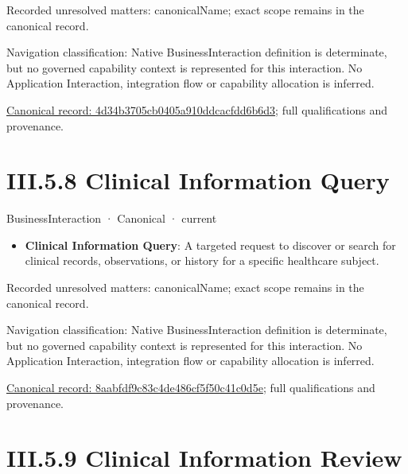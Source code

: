 {\small Recorded unresolved matters: canonicalName; exact scope remains in the canonical record.}\par
{\small Navigation classification: Native BusinessInteraction definition is determinate, but no governed capability context is represented for this interaction. No Application Interaction, integration flow or capability allocation is inferred.}\par
{\footnotesize \href{../../../../continuum/business/business-interaction/4d34b3705cb0405a910ddcacfdd6b6d3.md}{Canonical record: 4d34b3705cb0405a910ddcacfdd6b6d3}; full qualifications and provenance.}\par
\section*{III.5.8 Clinical Information Query}
\label{navigation:III.5.8}

\label{element:8aabfdf9c83c4de486cf5f50c41c0d5e}
{\small BusinessInteraction · Canonical · current}\par

\begin{itemize}


\item \textbf{Clinical Information Query}: A targeted request to discover or search for clinical records, observations, or history for a specific healthcare subject.

\end{itemize}

{\small Recorded unresolved matters: canonicalName; exact scope remains in the canonical record.}\par
{\small Navigation classification: Native BusinessInteraction definition is determinate, but no governed capability context is represented for this interaction. No Application Interaction, integration flow or capability allocation is inferred.}\par
{\footnotesize \href{../../../../continuum/business/business-interaction/8aabfdf9c83c4de486cf5f50c41c0d5e.md}{Canonical record: 8aabfdf9c83c4de486cf5f50c41c0d5e}; full qualifications and provenance.}\par
\section*{III.5.9 Clinical Information Review}
\label{navigation:III.5.9}


